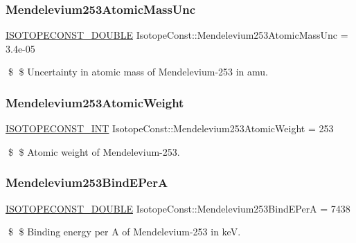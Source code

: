 \subsubsection{\texorpdfstring{Mendelevium253\+Atomic\+Mass\+Unc}{Mendelevium253AtomicMassUnc}}
{\footnotesize\ttfamily \mbox{\hyperlink{group___isotope_const-_macros_ga8f45a7272ce02c0b4c65c44636ed719a}{I\+S\+O\+T\+O\+P\+E\+C\+O\+N\+S\+T\+\_\+\+D\+O\+U\+B\+LE}} Isotope\+Const\+::\+Mendelevium253\+Atomic\+Mass\+Unc = 3.\+4e-\/05}

\$ \$ Uncertainty in atomic mass of Mendelevium-\/253 in amu. \mbox{\label{group___isotope_const-_mendelevium-_md253_gad767e209ae58ad29291a59bb7af8e929}} 
\subsubsection{\texorpdfstring{Mendelevium253\+Atomic\+Weight}{Mendelevium253AtomicWeight}}
{\footnotesize\ttfamily \mbox{\hyperlink{group___isotope_const-_macros_ga5f18360b3e99483a35c32d789e62621c}{I\+S\+O\+T\+O\+P\+E\+C\+O\+N\+S\+T\+\_\+\+I\+NT}} Isotope\+Const\+::\+Mendelevium253\+Atomic\+Weight = 253}

\$ \$ Atomic weight of Mendelevium-\/253. \mbox{\label{group___isotope_const-_mendelevium-_md253_gae3269b59c67b62e663fab2999e9b5dae}} 
\subsubsection{\texorpdfstring{Mendelevium253\+Bind\+E\+PerA}{Mendelevium253BindEPerA}}
{\footnotesize\ttfamily \mbox{\hyperlink{group___isotope_const-_macros_ga8f45a7272ce02c0b4c65c44636ed719a}{I\+S\+O\+T\+O\+P\+E\+C\+O\+N\+S\+T\+\_\+\+D\+O\+U\+B\+LE}} Isotope\+Const\+::\+Mendelevium253\+Bind\+E\+PerA = 7438}

\$ \$ Binding energy per A of Mendelevium-\/253 in keV. \mbox{\label{group___isotope_const-_mendelevium-_md253_ga82268956bc4e3f00943347348af47863}} 
